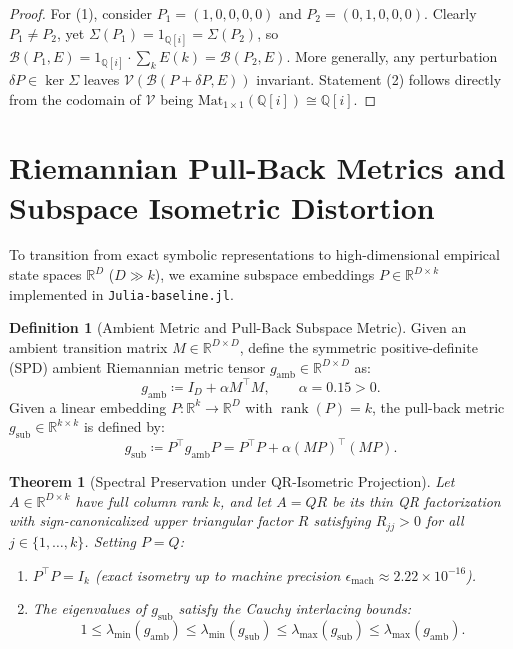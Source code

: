 \documentclass[11pt,a4paper]{article}
\theoremstyle{definition}
\newtheorem{definition}{Definition}[section]
\theoremstyle{plain}
\newtheorem{theorem}{Theorem}[section]
\theoremstyle{remark}
\DeclareMathOperator{\rank}{rank}
\newcommand{\R}{\mathbb{R}}
\newcommand{\Qi}{\mathbb{Q}[i]}
\newcommand{\Mat}{\mathrm{Mat}}
\begin{document}
\begin{proof}
For (1), consider $P_1 = (1, 0, 0, 0, 0)$ and $P_2 = (0, 1, 0, 0, 0)$. Clearly $P_1 \neq P_2$, yet $\Sigma(P_1) = 1_{\Qi} = \Sigma(P_2)$, so $\mathcal{B}(P_1, E) = 1_{\Qi} \cdot \sum_k E(k) = \mathcal{B}(P_2, E)$. More generally, any perturbation $\delta P \in \ker \Sigma$ leaves $\mathcal{V}(\mathcal{B}(P + \delta P, E))$ invariant. Statement (2) follows directly from the codomain of $\mathcal{V}$ being $\Mat_{1\times 1}(\Qi) \cong \Qi$.
\end{proof}

\section{Riemannian Pull-Back Metrics and Subspace Isometric Distortion}

To transition from exact symbolic representations to high-dimensional empirical state spaces $\R^D$ ($D \gg k$), we examine subspace embeddings $P \in \R^{D \times k}$ implemented in \texttt{Julia-baseline.jl}.

\begin{definition}[Ambient Metric and Pull-Back Subspace Metric]
Given an ambient transition matrix $M \in \R^{D \times D}$, define the symmetric positive-definite (SPD) ambient Riemannian metric tensor $g_{\mathrm{amb}} \in \R^{D \times D}$ as:
\begin{equation}
    g_{\mathrm{amb}} \coloneqq I_D + \alpha M^\top M, \qquad \alpha = 0.15 > 0.
\end{equation}
Given a linear embedding $P : \R^k \to \R^D$ with $\rank(P) = k$, the pull-back metric $g_{\mathrm{sub}} \in \R^{k \times k}$ is defined by:
\begin{equation}
    g_{\mathrm{sub}} \coloneqq P^\top g_{\mathrm{amb}} P = P^\top P + \alpha (MP)^\top (MP).
\end{equation}
\end{definition}

\begin{theorem}[Spectral Preservation under QR-Isometric Projection]
Let $A \in \R^{D \times k}$ have full column rank $k$, and let $A = Q R$ be its thin QR factorization with sign-canonicalized upper triangular factor $R$ satisfying $R_{jj} > 0$ for all $j \in \{1, \dots, k\}$. Setting $P = Q$:
\begin{enumerate}
    \item $P^\top P = I_k$ (exact isometry up to machine precision $\epsilon_{\mathrm{mach}} \approx 2.22 \times 10^{-16}$).
    \item The eigenvalues of $g_{\mathrm{sub}}$ satisfy the Cauchy interlacing bounds:
    \begin{equation}
        1 \le \lambda_{\min}(g_{\mathrm{amb}}) \le \lambda_{\min}(g_{\mathrm{sub}}) \le \lambda_{\max}(g_{\mathrm{sub}}) \le \lambda_{\max}(g_{\mathrm{amb}}).
    \end{equation}
\end{enumerate}
\end{theorem}
\end{document}
